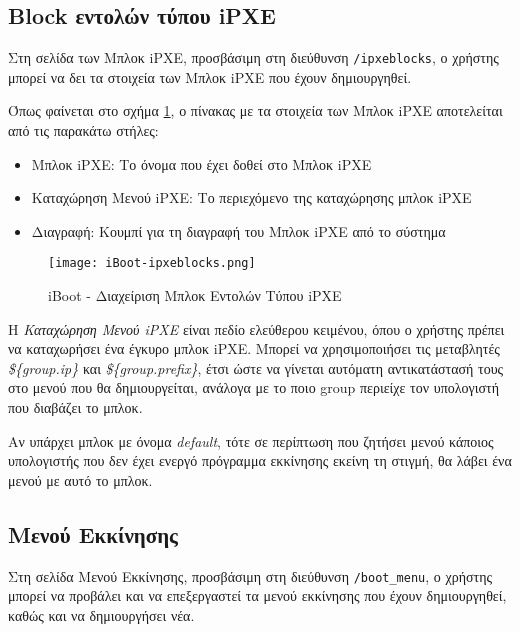 \subsection{Block εντολών τύπου iPXE}
\FloatBarrier
Στη σελίδα των Μπλοκ iPXE, προσβάσιμη στη διεύθυνση \verb!/ipxeblocks!, ο χρήστης μπορεί να δει τα στοιχεία των Μπλοκ iPXE που έχουν δημιουργηθεί.

Όπως φαίνεται στο σχήμα \ref{fig:iBoot_ipxeblocks}, ο πίνακας με τα στοιχεία των Μπλοκ iPXE αποτελείται από τις παρακάτω στήλες:
\begin{itemize}
	\item Μπλοκ iPXE: Το όνομα που έχει δοθεί στο Μπλοκ iPXE
	\item Καταχώρηση Μενού iPXE: Το περιεχόμενο της καταχώρησης μπλοκ iPXE
	\item Διαγραφή: Κουμπί για τη διαγραφή του Μπλοκ iPXE από το σύστημα
\end{itemize}

\begin{figure}[ht]
	\centering
	\texttt{[image: iBoot-ipxeblocks.png]}
	\caption{iBoot - Διαχείριση Μπλοκ Εντολών Τύπου iPXE}
	\label{fig:iBoot_ipxeblocks}
\end{figure}

H \emph{Καταχώρηση Μενού iPXE} είναι πεδίο ελεύθερου κειμένου, όπου ο χρήστης πρέπει να καταχωρήσει ένα έγκυρο μπλοκ iPXE. Μπορεί να χρησιμοποιήσει τις μεταβλητές \emph{\$\{group.ip\}} και \emph{\$\{group.prefix\}}, έτσι ώστε να γίνεται αυτόματη αντικατάστασή τους στο μενού που θα δημιουργείται, ανάλογα με το ποιο group περιείχε τον υπολογιστή που διαβάζει το μπλοκ.

Αν υπάρχει μπλοκ με όνομα \emph{default}, τότε σε περίπτωση που ζητήσει μενού κάποιος υπολογιστής που δεν έχει ενεργό πρόγραμμα εκκίνησης εκείνη τη στιγμή, θα λάβει ένα μενού με αυτό το μπλοκ.
\FloatBarrier

\subsection{Μενού Εκκίνησης}
\FloatBarrier
Στη σελίδα Μενού Εκκίνησης, προσβάσιμη στη διεύθυνση \verb!/boot_menu!, ο χρήστης μπορεί να προβάλει και να επεξεργαστεί τα μενού εκκίνησης που έχουν δημιουργηθεί, καθώς και να δημιουργήσει νέα.

